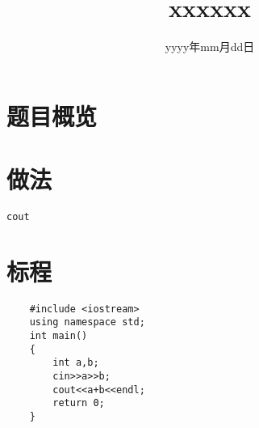 \documentclass{ctsol}
\title{xxxxxx}
\date{yyyy年mm月dd日}
\begin{document}
\maketitle
{}

\section*{题目概览}
\solutiontab

\makesolution
\section*{做法}
\verb|cout|

\section*{标程}
\begin{lstlisting}
    #include <iostream>
    using namespace std;
    int main()
    {
        int a,b;
        cin>>a>>b;
        cout<<a+b<<endl;
        return 0;
    }
\end{lstlisting}
\end{document}
